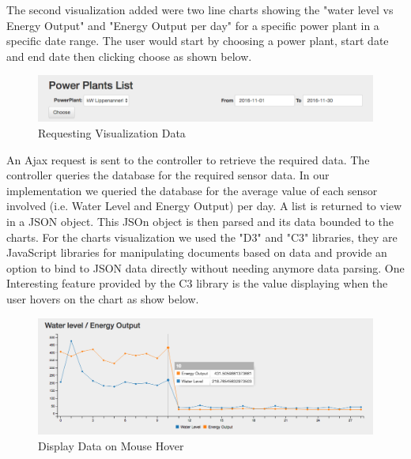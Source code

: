 The second visualization added were two line charts showing the "water level vs Energy Output" and "Energy Output per day" for a specific power plant in a specific date range. The user would start by choosing a power plant, start date and end date then clicking choose as shown below.
\begin{figure}[H]
\centering
\includegraphics[scale=0.5]{Images/ChooseVis.png}
\caption[Requesting Visualization Data]{Requesting Visualization Data}
\end{figure}
An Ajax request is sent to the controller to retrieve the required data. The controller queries the database for the required sensor data. In our implementation we queried the database for the average value of each sensor involved (i.e. Water Level and Energy Output) per day. A list is returned to view in a JSON object. This JSOn object is then parsed and its data bounded to the charts. For the charts visualization we used the "D3" and "C3" libraries, they are JavaScript libraries for manipulating documents based on data and provide an option to bind to JSON data directly without needing anymore data parsing. One Interesting feature provided by the C3 library is the value displaying when the user hovers on the chart as show below.
\begin{figure}[H]
\centering
\includegraphics[scale=0.45]{Images/MouseHover.png}
\caption[Display Data on Mouse Hover]{Display Data on Mouse Hover}
\end{figure}